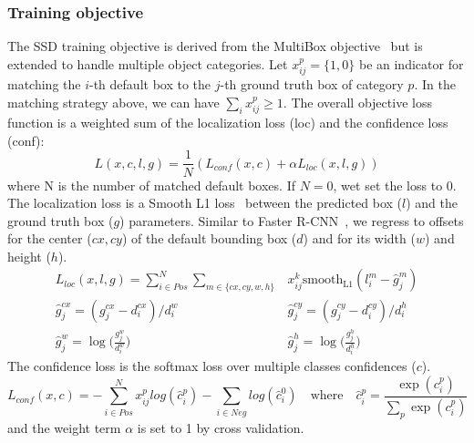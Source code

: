 \documentclass[runningheads]{llncs}
\begin{document}
\subsubsection{Training objective}
\label{sec:trainingobjective}
The SSD training objective is derived from the MultiBox objective~\cite{erhan2014scalable,szegedy2014scalable} but is extended to handle multiple object categories. Let $x_{ij}^p = \{1,0\}$ be an indicator for matching the $i$-th default box to the $j$-th ground truth box of category $p$.
In the matching strategy above, we can have $\sum_i x_{ij}^p \geq 1$.
The overall objective loss function is a weighted sum of the localization loss (loc) and the confidence loss (conf):
\begin{equation}
L(x, c, l, g) = \frac{1}{N}(L_{conf}(x, c) + \alpha L_{loc}(x, l, g))
\label{eq:loss}
\end{equation}
where N is the number of matched default boxes. If $N = 0$, wet set the loss to 0. The localization loss is a Smooth L1 loss~\cite{girshick2015fast} between the predicted box ($l$) and the ground truth box ($g$) parameters. Similar to Faster R-CNN~\cite{ren2015faster}, we regress to offsets for the center ($cx, cy$) of the default bounding box ($d$) and for its width ($w$) and height ($h$).
\begin{equation}
\begin{split}
L_{loc}(x,l,g) = \sum_{i\in Pos}^N \sum_{m\in\{cx, cy, w, h\}}& x_{ij}^k\text{smooth}_{\text{L1}}(l_i^m - \hat{g}_j^m)\\
\hat{g}_j^{cx} = (g_j^{cx} - d_i^{cx}) / d_i^w\quad\quad&
\hat{g}_j^{cy} = (g_j^{cy} - d_i^{cy}) / d_i^h\\
\hat{g}_j^{w} = \log\Big(\frac{g_j^{w}}{d_i^w}\Big)\quad\quad&
\hat{g}_j^{h} = \log\Big(\frac{g_j^{h}}{d_i^h}\Big)
\end{split}
\label{eq:locloss}
\end{equation}
The confidence loss is the softmax loss over multiple classes confidences ($c$).
\begin{equation}
L_{conf}(x, c) = - \sum_{i\in Pos}^N x_{ij}^p log(\hat{c}_i^p) - \sum_{i\in Neg} log(\hat{c}_i^0)\quad\text{where}\quad\hat{c}_i^p = \frac{\exp(c_i^p)}{\sum_p \exp(c_i^p)}
\label{eq:confloss}
\end{equation}
and the weight term $\alpha$ is set to 1 by cross validation.
\end{document}
